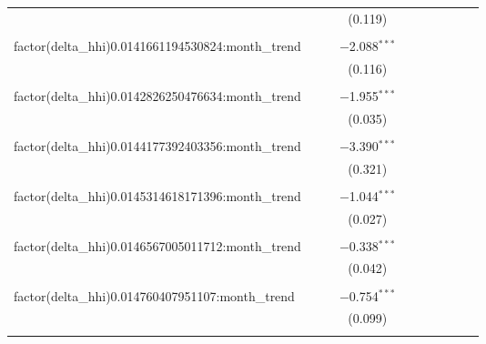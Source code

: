 \begin{table}[H]
{\begin{tabular}{@{\extracolsep{5pt}}lccccccccc}
   &  &  & (0.119) &  &  &  &  &  &  \\  

   & & & & & & & & & \\  

  factor(delta\_hhi)0.0141661194530824:month\_trend &  &  & $-$2.088$^{***}$ &  &  &  &  &  &  \\  

   &  &  & (0.116) &  &  &  &  &  &  \\  

   & & & & & & & & & \\  

  factor(delta\_hhi)0.0142826250476634:month\_trend &  &  & $-$1.955$^{***}$ &  &  &  &  &  &  \\  

   &  &  & (0.035) &  &  &  &  &  &  \\  

   & & & & & & & & & \\  

  factor(delta\_hhi)0.0144177392403356:month\_trend &  &  & $-$3.390$^{***}$ &  &  &  &  &  &  \\  

   &  &  & (0.321) &  &  &  &  &  &  \\  

   & & & & & & & & & \\  

  factor(delta\_hhi)0.0145314618171396:month\_trend &  &  & $-$1.044$^{***}$ &  &  &  &  &  &  \\  

   &  &  & (0.027) &  &  &  &  &  &  \\  

   & & & & & & & & & \\  

  factor(delta\_hhi)0.0146567005011712:month\_trend &  &  & $-$0.338$^{***}$ &  &  &  &  &  &  \\  

   &  &  & (0.042) &  &  &  &  &  &  \\  

   & & & & & & & & & \\  

  factor(delta\_hhi)0.014760407951107:month\_trend &  &  & $-$0.754$^{***}$ &  &  &  &  &  &  \\  

   &  &  & (0.099) &  &  &  &  &  &  \\  

   & & & & & & & & & \\  


\end{tabular}}
\end{table}
